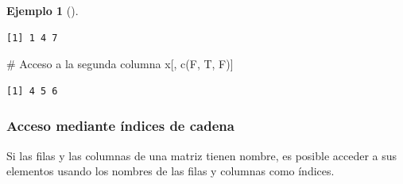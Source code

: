 \documentclass[
  a4paper,
]{scrreport}
\newenvironment{Shaded}{\begin{snugshade}}{\end{snugshade}}
\newcommand{\CommentTok}[1]{\textcolor[rgb]{0.37,0.37,0.37}{#1}}
\newcommand{\FunctionTok}[1]{\textcolor[rgb]{0.28,0.35,0.67}{#1}}
\newcommand{\NormalTok}[1]{\textcolor[rgb]{0.00,0.23,0.31}{#1}}
\theoremstyle{definition}
\newtheorem{example}{Ejemplo}[chapter]
\theoremstyle{definition}
\theoremstyle{remark}
\begin{document}
\begin{example}[]
\begin{verbatim}
[1] 1 4 7
\end{verbatim}

\begin{Shaded}
\begin{Highlighting}[]
\CommentTok{\# Acceso a la segunda columna}
\NormalTok{x[, }\FunctionTok{c}\NormalTok{(F, T, F)]}
\end{Highlighting}
\end{Shaded}

\begin{verbatim}
[1] 4 5 6
\end{verbatim}

\end{example}

\hypertarget{acceso-mediante-uxedndices-de-cadena}{%
\subsubsection{Acceso mediante índices de
cadena}\label{acceso-mediante-uxedndices-de-cadena}}

Si las filas y las columnas de una matriz tienen nombre, es posible
acceder a sus elementos usando los nombres de las filas y columnas como
índices.
\end{document}
